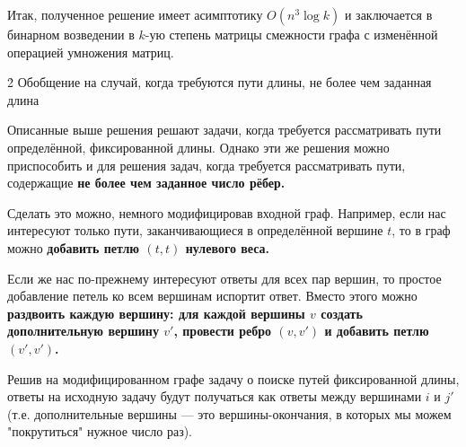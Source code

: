Итак, полученное решение имеет асимптотику $O (n^3 \log k)$ и заключается в бинарном возведении в $k$-ую степень матрицы смежности графа с изменённой операцией умножения матриц.


\h2{ Обобщение на случай, когда требуются пути длины, не более чем заданная длина }

Описанные выше решения решают задачи, когда требуется рассматривать пути определённой, фиксированной длины. Однако эти же решения можно приспособить и для решения задач, когда требуется рассматривать пути, содержащие \bf{не более} чем заданное число рёбер.

Сделать это можно, немного модифицировав входной граф. Например, если нас интересуют только пути, заканчивающиеся в определённой вершине $t$, то в граф можно \bf{добавить петлю} $(t,t)$ нулевого веса.

Если же нас по-прежнему интересуют ответы для всех пар вершин, то простое добавление петель ко всем вершинам испортит ответ. Вместо этого можно \bf{раздвоить} каждую вершину: для каждой вершины $v$ создать дополнительную вершину $v'$, провести ребро $(v,v')$ и добавить петлю $(v',v')$.

Решив на модифицированном графе задачу о поиске путей фиксированной длины, ответы на исходную задачу будут получаться как ответы между вершинами $i$ и $j'$ (т.е. дополнительные вершины --- это вершины-окончания, в которых мы можем "покрутиться" нужное число раз).


